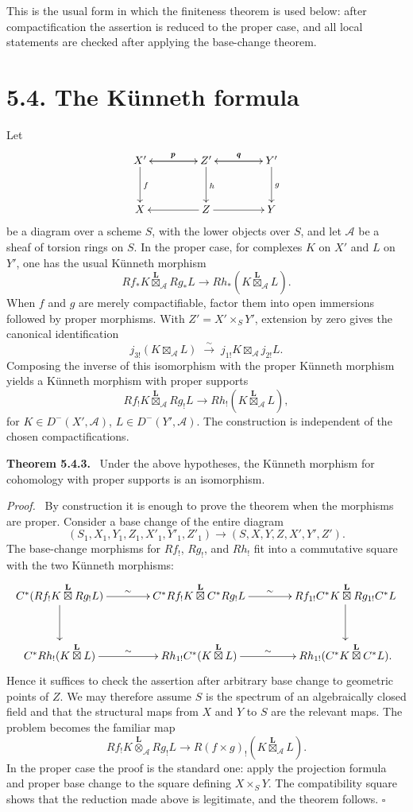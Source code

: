 \documentclass[12pt]{article}
\newcommand{\Aa}{\mathcal A}
\newcommand{\boxtimesL}{\mathbin{\overset{\mathbf L}{\boxtimes}}}
\newcommand{\otimesL}{\mathbin{\overset{\mathbf L}{\otimes}}}
\newcommand{\qedtext}{\hfill\(\square\)}
\newenvironment{statement}[1]{\par\medskip\noindent\textbf{#1.}\ }{\par\medskip}
\newenvironment{prooftext}[1][Proof]{\par\noindent\emph{#1.}\ }{\par\medskip}
\begin{document}
This is the usual form in which the finiteness theorem is used below: after compactification the assertion is reduced to the proper case, and all local statements are checked after applying the base-change theorem.

\section*{5.4. The K\"unneth formula}

Let
\[
\xymatrix@C=1.5cm@R=1.1cm{
X'\ar[r]^p\ar[d]^f&Z'\ar[l]_p\ar[r]^q\ar[d]^h&Y'\ar[l]_q\ar[d]^g\\
X&Z\ar[l]\ar[r]&Y
}
\]
be a diagram over a scheme \(S\), with the lower objects over \(S\), and let \(\Aa\) be a sheaf of torsion rings on \(S\). In the proper case, for complexes \(K\) on \(X'\) and \(L\) on \(Y'\), one has the usual K\"unneth morphism
\[
Rf_*K\boxtimesL_{\Aa}Rg_*L\longrightarrow Rh_*(K\boxtimesL_{\Aa}L).
\]
When \(f\) and \(g\) are merely compactifiable, factor them into open immersions followed by proper morphisms. With \(Z'=X'\times_S Y'\), extension by zero gives the canonical identification
\[
j_{3!}(K\boxtimes_{\Aa}L)
\;\xrightarrow{\sim}\;
 j_{1!}K\boxtimes_{\Aa}j_{2!}L.
\]
Composing the inverse of this isomorphism with the proper K\"unneth morphism yields a K\"unneth morphism with proper supports
\[
Rf_!K\boxtimesL_{\Aa}Rg_!L
\longrightarrow
Rh_!(K\boxtimesL_{\Aa}L),
\]
for \(K\in D^-(X',\Aa)\), \(L\in D^-(Y',\Aa)\). The construction is independent of the chosen compactifications.

\begin{statement}{Theorem 5.4.3}
Under the above hypotheses, the K\"unneth morphism for cohomology with proper supports is an isomorphism.
\end{statement}

\begin{prooftext}
By construction it is enough to prove the theorem when the morphisms are proper. Consider a base change of the entire diagram
\[
(S_1,X_1,Y_1,Z_1,X'_1,Y'_1,Z'_1)\longrightarrow(S,X,Y,Z,X',Y',Z').
\]
The base-change morphisms for \(Rf_!\), \(Rg_!\), and \(Rh_!\) fit into a commutative square with the two K\"unneth morphisms:
\[
\xymatrix@C=1.35cm@R=1.1cm{
C^*(Rf_!K\boxtimesL Rg_!L)\ar[r]^-{\sim}\ar[d]&C^*Rf_!K\boxtimesL C^*Rg_!L\ar[r]^-{\sim}&Rf_{1!}C^*K\boxtimesL Rg_{1!}C^*L\ar[d]\\
C^*Rh_!(K\boxtimesL L)\ar[r]^-{\sim}&Rh_{1!}C^*(K\boxtimesL L)\ar[r]^-{\sim}&Rh_{1!}(C^*K\boxtimesL C^*L).
}
\]
Hence it suffices to check the assertion after arbitrary base change to geometric points of \(Z\). We may therefore assume \(S\) is the spectrum of an algebraically closed field and that the structural maps from \(X\) and \(Y\) to \(S\) are the relevant maps. The problem becomes the familiar map
\[
Rf_!K\otimesL_{\Aa}Rg_!L\longrightarrow R(f\times g)_!(K\boxtimesL_{\Aa}L).
\]
In the proper case the proof is the standard one: apply the projection formula and proper base change to the square defining \(X\times_S Y\). The compatibility square shows that the reduction made above is legitimate, and the theorem follows. \qedtext
\end{prooftext}
\end{document}
